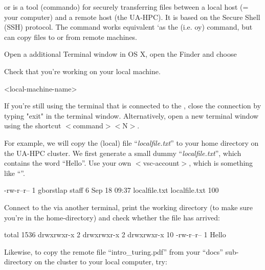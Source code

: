  or  is a tool (commando) for securely
transferring files between a local host (= your computer) and a remote host
(the UA-HPC). It is based on the Secure Shell (SSH) protocol.  The 
command works equivalent `as the   (i.e. oy)
command, but can copy files to or from remote machines.

Open a additional Terminal window in OS X, open the Finder and choose


Check that you're working on your local machine.

\begin{prompt}
<local-machine-name>
\end{prompt}

If you're still using the terminal that is connected to the \hpc, close the
connection by typing "exit" in the terminal window. Alternatively, open a new
terminal window using the shortcut $<$command$>$$<$N$>$.

For example, we will copy the (local) file ``\emph{localfile.txt}'' to your
home directory on the UA-HPC cluster. We first generate a small dummy
``\emph{localfile.txt}'', which contains the word ``Hello''.  Use your own
$<$vsc-account$>$, which is something like ``\emph{\userid}''.

\begin{prompt}
-rw-r--r-- 1 gborstlap  staff   6 Sep 18 09:37 localfile.txt
localfile.txt    100%
\end{prompt}

Connect to the \hpc via another terminal, print the working directory (to make
sure you're in the home-directory) and check whether the file has arrived:

\begin{prompt}
total 1536
drwxrwxr-x  2 %
drwxrwxr-x  2 %
drwxrwxr-x 10 %
-rw-r--r--  1 %
Hello
\end{prompt}

Likewise, to copy the remote file ``intro\_turing.pdf'' from your ``docs''
sub-directory on the cluster to your local computer, try:

